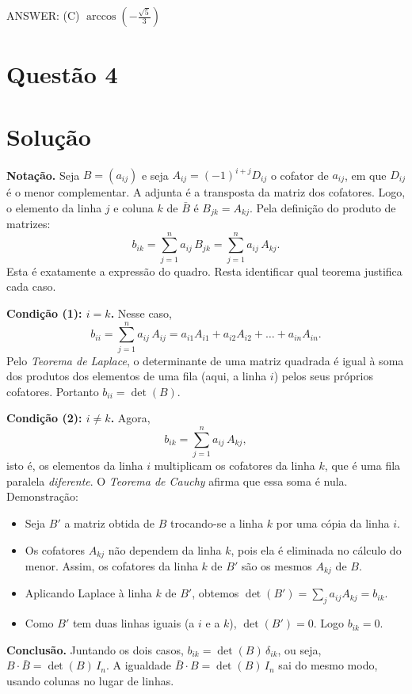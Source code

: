 \documentclass{article}%
\begin{document}
ANSWER: (C) $\arccos\left(-\frac{\sqrt5}{3}\right)$%
\newpage%
\section*{Questão 4}

\section*{Solução}

\textbf{Notação.} Seja $B=(a_{ij})$ e seja $A_{ij}=(-1)^{i+j}D_{ij}$ o cofator de $a_{ij}$, em que $D_{ij}$ é o menor complementar. A adjunta é a transposta da matriz dos cofatores. Logo, o elemento da linha $j$ e coluna $k$ de $\bar B$ é $B_{jk}=A_{kj}$. Pela definição do produto de matrizes:
\[
b_{ik}=\sum_{j=1}^{n}a_{ij}\,B_{jk}=\sum_{j=1}^{n}a_{ij}\,A_{kj}.
\]
Esta é exatamente a expressão do quadro. Resta identificar qual teorema justifica cada caso.

\textbf{Condição (1): $i=k$.} Nesse caso,
\[
b_{ii}=\sum_{j=1}^{n}a_{ij}\,A_{ij}=a_{i1}A_{i1}+a_{i2}A_{i2}+\dots+a_{in}A_{in}.
\]
Pelo \emph{Teorema de Laplace}, o determinante de uma matriz quadrada é igual à soma dos produtos dos elementos de uma fila (aqui, a linha $i$) pelos seus próprios cofatores. Portanto $b_{ii}=\det(B)$.

\textbf{Condição (2): $i\neq k$.} Agora,
\[
b_{ik}=\sum_{j=1}^{n}a_{ij}\,A_{kj},
\]
isto é, os elementos da linha $i$ multiplicam os cofatores da linha $k$, que é uma fila paralela \emph{diferente}. O \emph{Teorema de Cauchy} afirma que essa soma é nula. Demonstração:
\begin{itemize}
\item Seja $B'$ a matriz obtida de $B$ trocando-se a linha $k$ por uma cópia da linha $i$.
\item Os cofatores $A_{kj}$ não dependem da linha $k$, pois ela é eliminada no cálculo do menor. Assim, os cofatores da linha $k$ de $B'$ são os mesmos $A_{kj}$ de $B$.
\item Aplicando Laplace à linha $k$ de $B'$, obtemos $\det(B')=\sum_{j}a_{ij}A_{kj}=b_{ik}$.
\item Como $B'$ tem duas linhas iguais (a $i$ e a $k$), $\det(B')=0$. Logo $b_{ik}=0$.
\end{itemize}

\textbf{Conclusão.} Juntando os dois casos, $b_{ik}=\det(B)\,\delta_{ik}$, ou seja, $B\cdot\bar B=\det(B)\,I_n$. A igualdade $\bar B\cdot B=\det(B)\,I_n$ sai do mesmo modo, usando colunas no lugar de linhas.
\end{document}
